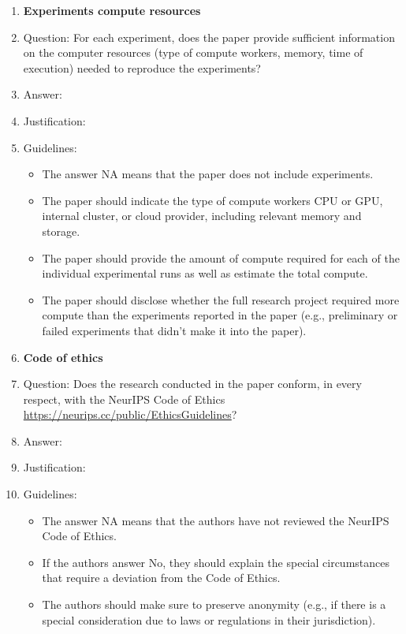 \documentclass{article}
\begin{document}
\begin{enumerate}
\item {\bf Experiments compute resources}
    \item[] Question: For each experiment, does the paper provide sufficient information on the computer resources (type of compute workers, memory, time of execution) needed to reproduce the experiments?
    \item[] Answer: \answerTODO{} %
    \item[] Justification: \justificationTODO{}
    \item[] Guidelines:
    \begin{itemize}
        \item The answer NA means that the paper does not include experiments.
        \item The paper should indicate the type of compute workers CPU or GPU, internal cluster, or cloud provider, including relevant memory and storage.
        \item The paper should provide the amount of compute required for each of the individual experimental runs as well as estimate the total compute. 
        \item The paper should disclose whether the full research project required more compute than the experiments reported in the paper (e.g., preliminary or failed experiments that didn't make it into the paper). 
    \end{itemize}
    
\item {\bf Code of ethics}
    \item[] Question: Does the research conducted in the paper conform, in every respect, with the NeurIPS Code of Ethics \url{https://neurips.cc/public/EthicsGuidelines}?
    \item[] Answer: \answerTODO{} %
    \item[] Justification: \justificationTODO{}
    \item[] Guidelines:
    \begin{itemize}
        \item The answer NA means that the authors have not reviewed the NeurIPS Code of Ethics.
        \item If the authors answer No, they should explain the special circumstances that require a deviation from the Code of Ethics.
        \item The authors should make sure to preserve anonymity (e.g., if there is a special consideration due to laws or regulations in their jurisdiction).
    \end{itemize}



\end{enumerate}
\end{document}
